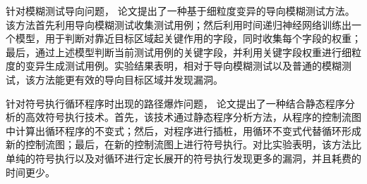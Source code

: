 \begin{cabstract}
针对模糊测试导向问题，
论文提出了一种基于细粒度变异的导向模糊测试方法。该方法首先利用导向模糊测试收集测试用例；然后利用时间递归神经网络训练出一个模型，用于判断对靠近目标区域起关键作用的字段，同时收集每个字段的权重；最后，通过上述模型判断当前测试用例的关键字段，并利用关键字段权重进行细粒度的变异生成测试用例。实验结果表明，相对于导向模糊测试以及普通的模糊测试，该方法能更有效的导向目标区域并发现漏洞。

针对符号执行循环程序时出现的路径爆炸问题，
论文提出了一种结合静态程序分析的高效符号执行技术。首先，该技术通过静态程序分析方法，从程序的控制流图中计算出循环程序的不变式；然后，对程序进行插桩，用循环不变式代替循环形成新的控制流图；最后，在新的控制流图上进行符号执行。对比实验表明，该方法比单纯的符号执行以及对循环进行定长展开的符号执行发现更多的漏洞，并且耗费的时间更少。

\end{cabstract}

